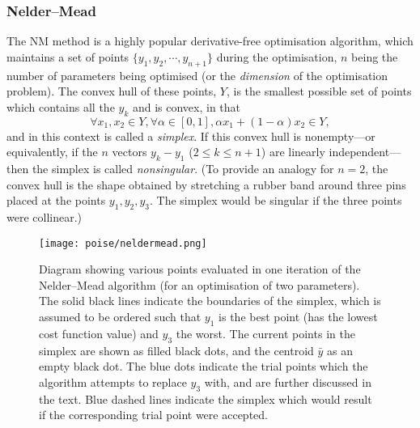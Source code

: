 \subsubsection{Nelder--Mead}

The NM method is a highly popular derivative-free optimisation algorithm, which maintains a set of points $\{y_1, y_2, \cdots, y_{n+1}\}$ during the optimisation, $n$ being the number of parameters being optimised (or the \textit{dimension} of the optimisation problem).
The convex hull of these points, $Y$, is the smallest possible set of points which contains all the $y_k$ and is convex, in that
\begin{equation}
    \label{eq:convex_hull}
    \forall x_1, x_2 \in Y, \forall \alpha \in [0, 1], \alpha x_1 + (1 - \alpha) x_2 \in Y,
\end{equation}
and in this context is called a \textit{simplex}.
If this convex hull is nonempty---or equivalently, if the $n$ vectors $y_k - y_1$ ($2 \leq k \leq n + 1$) are linearly independent---then the simplex is called \textit{nonsingular}.
(To provide an analogy for $n = 2$, the convex hull is the shape obtained by stretching a rubber band around three pins placed at the points $y_1, y_2, y_3$.
The simplex would be singular if the three points were collinear.)

\begin{figure}[htb]
    \centering
    \texttt{[image: poise/neldermead.png]}%
    \caption[Trial points in an iteration of the Nelder--Mead algorithm]{
        Diagram showing various points evaluated in one iteration of the Nelder--Mead algorithm (for an optimisation of two parameters).
        The solid black lines indicate the boundaries of the simplex, which is assumed to be ordered such that $y_1$ is the best point (has the lowest cost function value) and $y_3$ the worst.
        The current points in the simplex are shown as filled black dots, and the centroid $\bar{y}$ as an empty black dot.
        The blue dots indicate the trial points which the algorithm attempts to replace $y_3$ with, and are further discussed in the text.
        Blue dashed lines indicate the simplex which would result if the corresponding trial point were accepted.
    }
    \label{fig:neldermead}
\end{figure}

